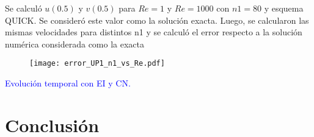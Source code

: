 \documentclass[aps,prb,twocolumn,superscriptaddress,floatfix,longbibliography,10pt]{revtex4-2}
\newcounter{para}
\begin{document}
Se calculó $u(0.5)$ y $v(0.5)$ para $Re = 1$ y $Re = 1000$ con $n1 = 80$ y esquema QUICK. Se consideró este valor como la solución exacta. Luego, se calcularon las mismas velocidades para distintos n1 y se calculó el error respecto a la solución numérica considerada como la exacta

\begin{figure}[h]
  \texttt{[image: error\_UP1\_n1\_vs\_Re.pdf]}
  \caption{}
   \label{fig:error_UP1_n1_vs_Re}
\end{figure}


\textcolor{blue}{Evolución temporal con EI y CN.}





\section{Conclusión}


\end{document}
